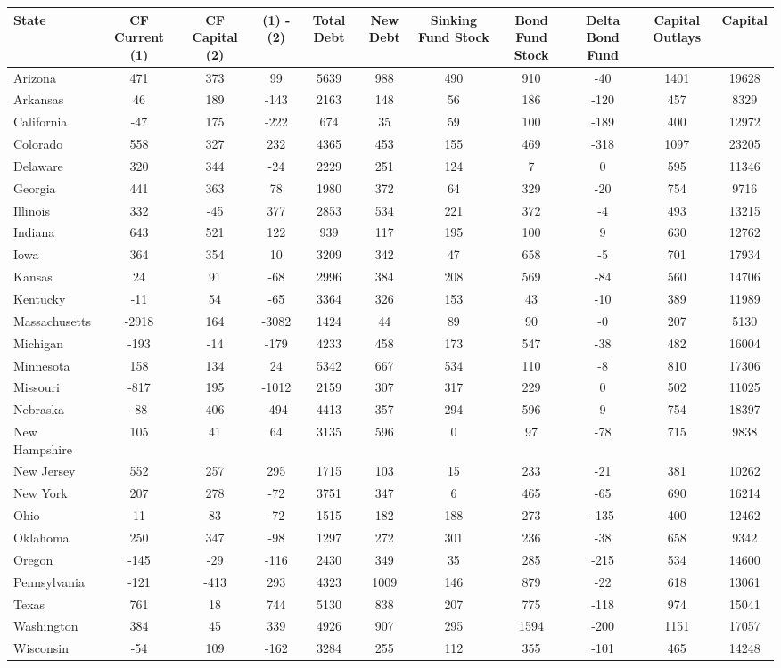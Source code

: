 
\begin{tabularx}{\linewidth}{@{}lCCCCCCCCCC@{}}

\toprule
{State}&{CF Current (1)}&{CF Capital (2)}&{(1) - (2)}&{Total Debt}&{New Debt}&{Sinking Fund Stock}&{Bond Fund Stock}&{Delta Bond Fund}&{Capital Outlays}&{Capital} \tabularnewline
\midrule \addlinespace[\belowrulesep]
Arizona&471&373&99&5639&988&490&910&-40&1401&19628 \tabularnewline
Arkansas&46&189&-143&2163&148&56&186&-120&457&8329 \tabularnewline
California&-47&175&-222&674&35&59&100&-189&400&12972 \tabularnewline
Colorado&558&327&232&4365&453&155&469&-318&1097&23205 \tabularnewline
Delaware&320&344&-24&2229&251&124&7&0&595&11346 \tabularnewline
Georgia&441&363&78&1980&372&64&329&-20&754&9716 \tabularnewline
Illinois&332&-45&377&2853&534&221&372&-4&493&13215 \tabularnewline
Indiana&643&521&122&939&117&195&100&9&630&12762 \tabularnewline
Iowa&364&354&10&3209&342&47&658&-5&701&17934 \tabularnewline
Kansas&24&91&-68&2996&384&208&569&-84&560&14706 \tabularnewline
Kentucky&-11&54&-65&3364&326&153&43&-10&389&11989 \tabularnewline
Massachusetts&-2918&164&-3082&1424&44&89&90&-0&207&5130 \tabularnewline
Michigan&-193&-14&-179&4233&458&173&547&-38&482&16004 \tabularnewline
Minnesota&158&134&24&5342&667&534&110&-8&810&17306 \tabularnewline
Missouri&-817&195&-1012&2159&307&317&229&0&502&11025 \tabularnewline
Nebraska&-88&406&-494&4413&357&294&596&9&754&18397 \tabularnewline
New Hampshire&105&41&64&3135&596&0&97&-78&715&9838 \tabularnewline
New Jersey&552&257&295&1715&103&15&233&-21&381&10262 \tabularnewline
New York&207&278&-72&3751&347&6&465&-65&690&16214 \tabularnewline
Ohio&11&83&-72&1515&182&188&273&-135&400&12462 \tabularnewline
Oklahoma&250&347&-98&1297&272&301&236&-38&658&9342 \tabularnewline
Oregon&-145&-29&-116&2430&349&35&285&-215&534&14600 \tabularnewline
Pennsylvania&-121&-413&293&4323&1009&146&879&-22&618&13061 \tabularnewline
Texas&761&18&744&5130&838&207&775&-118&974&15041 \tabularnewline
Washington&384&45&339&4926&907&295&1594&-200&1151&17057 \tabularnewline
Wisconsin&-54&109&-162&3284&255&112&355&-101&465&14248 \tabularnewline
\bottomrule 

\end{tabularx}

